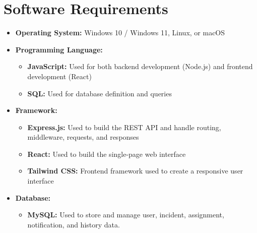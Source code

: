 \documentclass[a4paper,12pt]{report}
\begin{document}
	\section{Software Requirements}
	\begin{itemize}
		
		\item \textbf{Operating System:} Windows 10 / Windows 11, Linux, or macOS
		
		\item \textbf{Programming Language:}
		\begin{itemize}
			\item \textbf{JavaScript:} Used for both backend development (Node.js) and frontend development (React)
			\item \textbf{SQL:} Used for database definition and queries
		\end{itemize}
		
		\item \textbf{Framework:}
		\begin{itemize}
			\item \textbf{Express.js:} Used to build the REST API and handle routing, middleware, requests, and responses
			\item \textbf{React:} Used to build the single-page web interface
			\item \textbf{Tailwind CSS:} Frontend framework used to create a responsive user interface
		\end{itemize}
		
		\item \textbf{Database:}
		\begin{itemize}
			\item \textbf{MySQL:} Used to store and manage user, incident, assignment, notification, and history data.
		\end{itemize}
		

\end{itemize}
\end{document}
